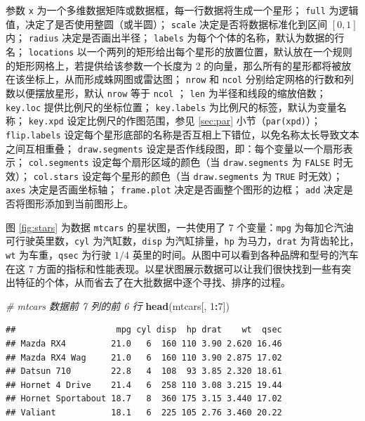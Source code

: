\documentclass[
  b5paper,
  UTF8,twoside]{book}
\newenvironment{Shaded}{\begin{snugshade}}{\end{snugshade}}
\newcommand{\CommentTok}[1]{\textcolor[rgb]{0.56,0.35,0.01}{\textit{#1}}}
\newcommand{\DecValTok}[1]{\textcolor[rgb]{0.00,0.00,0.81}{#1}}
\newcommand{\FunctionTok}[1]{\textcolor[rgb]{0.13,0.29,0.53}{\textbf{#1}}}
\newcommand{\NormalTok}[1]{#1}
\newcommand{\SpecialCharTok}[1]{\textcolor[rgb]{0.81,0.36,0.00}{\textbf{#1}}}
\begin{document}
参数 \texttt{x} 为一个多维数据矩阵或数据框，每一行数据将生成一个星形； \texttt{full} 为逻辑值，决定了是否使用整圆（或半圆）； \texttt{scale} 决定是否将数据标准化到区间 \([0,1]\) 内； \texttt{radius} 决定是否画出半径； \texttt{labels} 为每个个体的名称，默认为数据的行名； \texttt{locations} 以一个两列的矩形给出每个星形的放置位置，默认放在一个规则的矩形网格上，若提供给该参数一个长度为 2 的向量，那么所有的星形都将被放在该坐标上，从而形成蛛网图或雷达图； \texttt{nrow} 和 \texttt{ncol} 分别给定网格的行数和列数以便摆放星形，默认 \texttt{nrow} 等于 \texttt{ncol} ； \texttt{len} 为半径和线段的缩放倍数； \texttt{key.loc} 提供比例尺的坐标位置； \texttt{key.labels} 为比例尺的标签，默认为变量名称； \texttt{key.xpd} 设定比例尺的作图范围，参见 \ref{sec:par} 小节（\texttt{par(\textquotesingle{}xpd\textquotesingle{})}）； \texttt{flip.labels} 设定每个星形底部的名称是否互相上下错位，以免名称太长导致文本之间互相重叠； \texttt{draw.segments} 设定是否作线段图，即：每个变量以一个扇形表示； \texttt{col.segments} 设定每个扇形区域的颜色（当 \texttt{draw.segments} 为 \texttt{FALSE} 时无效）； \texttt{col.stars} 设定每个星形的颜色（当 \texttt{draw.segments} 为 \texttt{TRUE} 时无效）； \texttt{axes} 决定是否画坐标轴； \texttt{frame.plot} 决定是否画整个图形的边框； \texttt{add} 决定是否将图形添加到当前图形上。

图 \ref{fig:stars}
为数据 \texttt{mtcars} 的星状图，一共使用了 7 个变量：\texttt{mpg} 为每加仑汽油可行驶英里数，\texttt{cyl} 为汽缸数，\texttt{disp} 为汽缸排量，\texttt{hp} 为马力，\texttt{drat} 为背齿轮比，\texttt{wt} 为车重，\texttt{qsec} 为行驶 \(1/4\) 英里的时间。从图中可以看到各种品牌和型号的汽车在这 7 方面的指标和性能表现。以星状图展示数据可以让我们很快找到一些有突出特征的个体，从而省去了在大批数据中逐个寻找、排序的过程。

\begin{Shaded}
\begin{Highlighting}[]
\CommentTok{\# mtcars 数据前 7 列的前 6 行}
\FunctionTok{head}\NormalTok{(mtcars[, }\DecValTok{1}\SpecialCharTok{:}\DecValTok{7}\NormalTok{])}
\end{Highlighting}
\end{Shaded}

\begin{verbatim}
##                    mpg cyl disp  hp drat    wt  qsec
## Mazda RX4         21.0   6  160 110 3.90 2.620 16.46
## Mazda RX4 Wag     21.0   6  160 110 3.90 2.875 17.02
## Datsun 710        22.8   4  108  93 3.85 2.320 18.61
## Hornet 4 Drive    21.4   6  258 110 3.08 3.215 19.44
## Hornet Sportabout 18.7   8  360 175 3.15 3.440 17.02
## Valiant           18.1   6  225 105 2.76 3.460 20.22
\end{verbatim}
\end{document}
